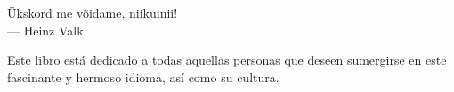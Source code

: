 
\thispagestyle{empty}


\vspace*{3cm}

\begin{center}
Ükskord me võidame, niikuinii! \\ \medskip
--- Heinz Valk
\end{center}

\medskip

\begin{center}
Este libro está dedicado a todas aquellas personas que deseen sumergirse en este fascinante y hermoso idioma, así como su cultura.
\end{center}
